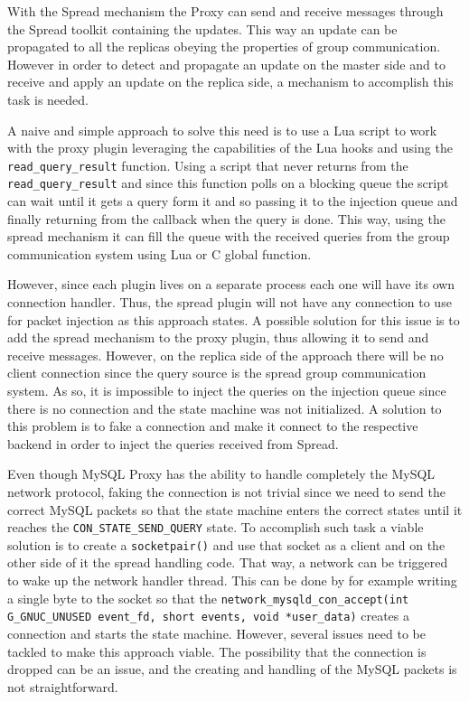 With the Spread mechanism the Proxy can send and receive messages through the Spread toolkit containing the updates. This way an update can be propagated to all the replicas obeying the properties of group communication. However in order to detect and propagate an update on the master side and to receive and apply an update on the replica side, a mechanism to accomplish this task is needed.

A naive and simple approach to solve this need is to use a Lua script to work with the proxy plugin leveraging the capabilities of the Lua hooks and using the \texttt{read\_query\_result} function. Using a script that never returns from the \texttt{read\_query\_result} and since this function polls on a blocking queue the script can wait until it gets a query form it and so passing it to the injection queue and finally returning from the callback when the query is done. This way, using the spread mechanism it can fill the queue with the received queries from the group communication system using Lua or C global function.	

However, since each plugin lives on a separate process each one will have its own connection handler. Thus, the spread plugin will not have any connection to use for packet injection as this approach states. A possible solution for this issue is to add the spread mechanism to the proxy plugin, thus allowing it to send and receive messages. However, on the replica side of the approach there will be no client connection since the query source is the spread group communication system. As so, it is impossible to inject the queries on the injection queue since there is no connection and the state machine was not initialized. A solution to this problem is to fake a connection and make it connect to the respective backend in order to inject the queries received from Spread.

Even though MySQL Proxy has the ability to handle completely the MySQL network protocol, faking the connection is not trivial since we need to send the correct MySQL packets so that the state machine enters the correct states until it reaches the \texttt{CON\_STATE\_SEND\_QUERY} state. To accomplish such task a viable solution is to create a \texttt{socketpair()} and use that socket as a client and on the other side of it the spread handling code. That way, a network can be triggered to wake up the network handler thread. This can be done by for example writing a single byte to the socket so that the \texttt{network\_mysqld\_con\_accept(int G\_GNUC\_UNUSED event\_fd, short events, void *user\_data)} creates a connection and starts the state machine. However, several issues need to be tackled to make this approach viable. The possibility that the connection is dropped can be an issue, and the creating and handling of the MySQL packets is not straightforward.


